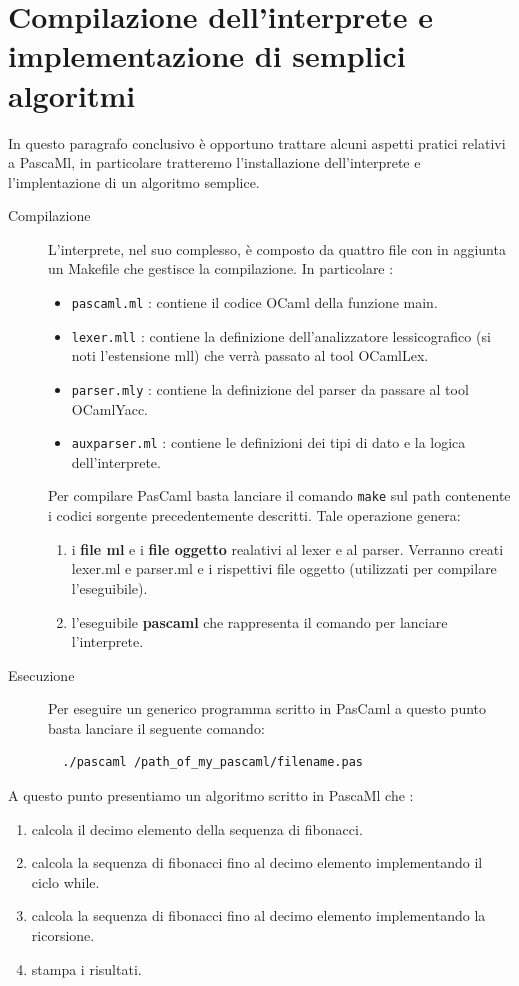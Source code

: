 \documentclass[a4paper,10pt]{article}
\begin{document}
\section{Compilazione dell'interprete e implementazione di semplici algoritmi}
In questo paragrafo conclusivo \`e opportuno trattare alcuni aspetti pratici
relativi a PascaMl, in particolare tratteremo l'installazione dell'interprete e
l'implentazione di un algoritmo semplice.

\begin{description}
 \item [Compilazione] L'interprete, nel suo complesso, \`e composto da quattro
file con in aggiunta un Makefile che gestisce la compilazione. In particolare :

\begin{itemize}
 \item \verb|pascaml.ml| : contiene il codice OCaml della funzione main.
 \item \verb|lexer.mll| : contiene la definizione dell'analizzatore
lessicografico (si noti l'estensione mll) che verr\`a passato al tool OCamlLex.
 \item \verb|parser.mly| : contiene la definizione del parser da passare al
tool OCamlYacc.
 \item \verb|auxparser.ml| : contiene le definizioni dei tipi di dato e la
logica dell'interprete.
\end{itemize}

Per compilare PasCaml basta lanciare il comando \verb|make| sul path contenente
i codici sorgente precedentemente descritti. Tale operazione genera: 

\begin{enumerate}
 \item i \textbf{file ml} e i \textbf{file oggetto}  realativi al lexer e al
parser. Verranno creati lexer.ml e parser.ml e i rispettivi file oggetto
(utilizzati per compilare l'eseguibile).
\item l'eseguibile \textbf{pascaml} che rappresenta il comando per lanciare
l'interprete.

\end{enumerate}
 \item [Esecuzione] Per eseguire un generico programma scritto in PasCaml a
questo punto basta lanciare il seguente comando:

\begin{verbatim}
  ./pascaml /path_of_my_pascaml/filename.pas
\end{verbatim}

\end{description}
A questo punto presentiamo un algoritmo scritto in PascaMl che :
\begin{enumerate}
 \item calcola il decimo elemento della sequenza di fibonacci.
 \item calcola la sequenza di fibonacci fino al decimo elemento implementando
il ciclo while.
 \item calcola la sequenza di fibonacci fino al decimo elemento implementando
la ricorsione.
 \item stampa i risultati.
\end{enumerate}
\end{document}
